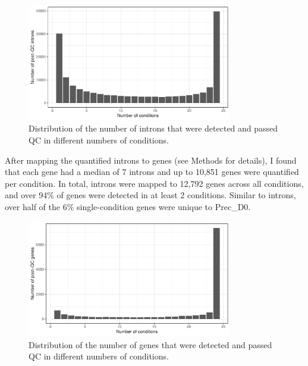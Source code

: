 \begin{figure}[H]
  \centering
  \includegraphics[width=0.8\textwidth]{dist_intron_num}
  \caption[Number of introns that passed QC versus the number of conditions where introns passed QC]{Distribution of the number of introns that were detected and passed QC in different numbers of conditions.}
  \label{fig:dist_intron_num}   
\end{figure}
After mapping the quantified introns to genes (see Methods for details), I found that each gene had a median of 7 introns and up to 10,851 genes were quantified per condition. In total, introns were mapped to 12,792 genes across all conditions, and over 94\% of genes were detected in at least 2 conditions. Similar to introns, over half of the 6\% single-condition genes were unique to Prec\_D0.

\begin{figure}[H]
  \centering
  \includegraphics[width=0.8\textwidth]{dist_gene_num}
  \caption[Number of genes with introns that passed QC versus the number of conditions where genes passed QC]{Distribution of the number of genes that were detected and passed QC in different numbers of conditions.}
  \label{fig:dist_gene_num}   
\end{figure}

